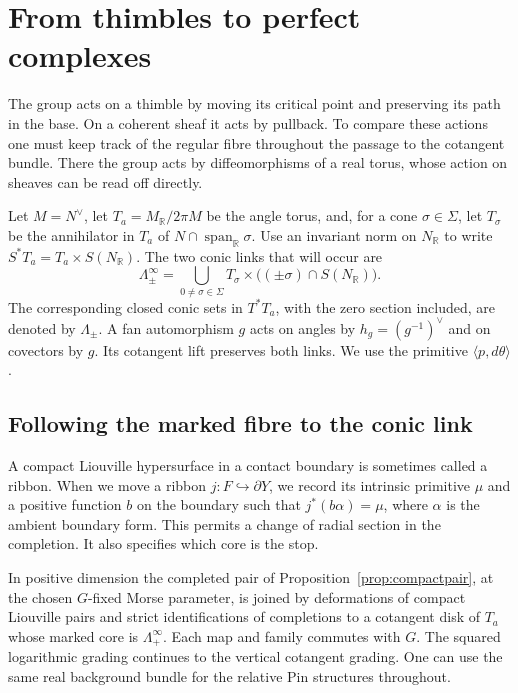 \section{From thimbles to perfect complexes}\label{sec:coherenttransport}

The group acts on a thimble by moving its critical point and preserving its path in the base. On a coherent sheaf it acts by pullback. To compare these actions one must keep track of the regular fibre throughout the passage to the cotangent bundle. There the group acts by diffeomorphisms of a real torus, whose action on sheaves can be read off directly.

Let $M=N^\vee$, let $T_a=M_{\mathbb R}/2\pi M$ be the angle torus, and, for a cone $\sigma\in\Sigma$, let $T_\sigma$ be the annihilator in $T_a$ of $N\cap\operatorname{span}_{\mathbb R}\sigma$. Use an invariant norm on $N_{\mathbb R}$ to write $S^*T_a=T_a\times S(N_{\mathbb R})$. The two conic links that will occur are
\[
 \Lambda_\pm^\infty
    =\bigcup_{0\ne\sigma\in\Sigma}T_\sigma\times
                       \big((\pm\sigma)\cap S(N_{\mathbb R})\big).
\]
The corresponding closed conic sets in $T^*T_a$, with the zero section included, are denoted by $\Lambda_\pm$. A fan automorphism $g$ acts on angles by $h_g=(g^{-1})^\vee$ and on covectors by $g$. Its cotangent lift preserves both links. We use the primitive $\langle p,d\theta\rangle$.

\subsection{Following the marked fibre to the conic link}
A compact Liouville hypersurface in a contact boundary is sometimes called a ribbon. When we move a ribbon $j:F\hookrightarrow\partial Y$, we record its intrinsic primitive $\mu$ and a positive function $b$ on the boundary such that $j^*(b\alpha)=\mu$, where $\alpha$ is the ambient boundary form. This permits a change of radial section in the completion. It also specifies which core is the stop.

\begin{lemma}\label{lem:equivariantlink}
In positive dimension the completed pair of Proposition~\ref{prop:compactpair}, at the chosen $G$-fixed Morse parameter, is joined by deformations of compact Liouville pairs and strict identifications of completions to a cotangent disk of $T_a$ whose marked core is $\Lambda_+^\infty$. Each map and family commutes with $G$. The squared logarithmic grading continues to the vertical cotangent grading. One can use the same real background bundle for the relative Pin structures throughout.
\end{lemma}

